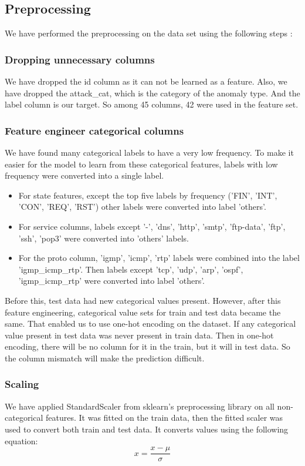 \documentclass[14pt, conference]{IEEEtran}
\begin{document}
\subsection{Preprocessing \label{preprocessing}}
We have performed the preprocessing on the data set using the following steps :

\subsubsection{Dropping unnecessary columns}
We have dropped the id column as it can not be learned as a feature. Also, we have dropped the attack\_cat, which is the category of the anomaly type. And the label column is our target. So among 45 columns, 42 were used in the feature set.

\subsubsection{Feature engineer categorical columns}
We have found many categorical labels to have a very low frequency. To make it easier for the model to learn from these categorical features, labels with low frequency were converted into a single label.

\begin{itemize}
    \item For state features, except the top five labels by frequency ('FIN', 'INT', 'CON', 'REQ', 'RST') other labels were converted into label 'others'.
    \item For service columns, labels except '-', 'dns', 'http', 'smtp', 'ftp-data', 'ftp', 'ssh', 'pop3' were converted into 'others' labels. 
    \item For the proto column, 'igmp', 'icmp', 'rtp' labels were combined into the label 'igmp\_icmp\_rtp'. Then labels except 'tcp', 'udp', 'arp', 'ospf', 'igmp\_icmp\_rtp' were converted into label 'others'. 
\end{itemize}

Before this, test data had new categorical values present. However, after this feature engineering, categorical value sets for train and test data became the same. That enabled us to use one-hot encoding on the dataset. If any categorical value present in test data was never present in train data. Then in one-hot encoding, there will be no column for it in the train, but it will in test data. So the column mismatch will make the prediction difficult. 


\subsubsection{Scaling}
We have applied StandardScaler from sklearn's preprocessing library on all non-categorical features. It was fitted on the train data, then the fitted scaler was used to convert both train and test data. It converts values using the following equation:
\begin{equation}
    x = \frac{x-\mu}{\sigma}
\end{equation}
\end{document}
